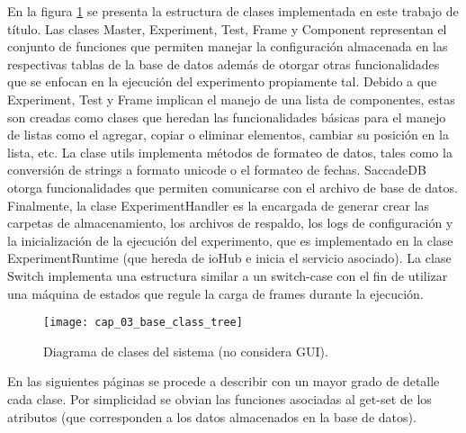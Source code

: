 \documentclass[\main/main.tex]{subfiles}
\begin{document}
			En la figura \ref{fig:03_base_class_tree} se presenta la estructura de clases implementada en este trabajo de título. Las clases Master, Experiment, Test, Frame y Component representan el conjunto de funciones que permiten manejar la configuración almacenada en las respectivas tablas de la base de datos además de otorgar otras funcionalidades que se enfocan en la ejecución del experimento propiamente tal. Debido a que Experiment, Test y Frame implican el manejo de una lista de componentes, estas son creadas como clases que heredan las funcionalidades básicas para el manejo de listas como el agregar, copiar o eliminar elementos, cambiar su posición en la lista, etc. La clase utils implementa métodos de formateo de datos, tales como la conversión de strings a formato unicode o el formateo de fechas. SaccadeDB otorga funcionalidades que permiten comunicarse con el archivo de base de datos. Finalmente, la clase ExperimentHandler es la encargada de generar crear las carpetas de almacenamiento, los archivos de respaldo, los logs de configuración y la inicialización de la ejecución del experimento, que es implementado en la clase ExperimentRuntime (que hereda de ioHub e inicia el servicio asociado). La clase Switch implementa una estructura similar a un switch-case con el fin de utilizar una máquina de estados que regule la carga de frames durante la ejecución.  
			\begin{figure}[H]
				\centering
				\texttt{[image: cap\_03\_base\_class\_tree]}
				\caption{Diagrama de clases del sistema (no considera GUI).}
				\label{fig:03_base_class_tree}
			\end{figure} 

			En las siguientes páginas se procede a describir con un mayor grado de detalle cada clase. Por simplicidad se obvian las funciones asociadas al get-set de los atributos (que corresponden a los datos almacenados en la base de datos).
			
\end{document}
